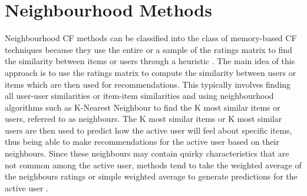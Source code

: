
\section{Neighbourhood Methods}

Neighbourhood CF methods can be classified into the class of memory-based CF techniques because they use the entire or a sample of the ratings matrix to find the similarity between items or users through a heuristic \cite{memorybased, schafer2007collaborative}. The main idea of this approach is to use the ratings matrix to compute the similarity between users or items which are then used for recommendations. This typically involves finding all user-user similarities or item-item similarities and using neighbourhood algorithms such as K-Nearest Neighbour to find the K most similar items or users, referred to as neighbours. The K most similar items or K most similar users are then used to predict how the active user will feel about specific items, thus being able to make recommendations for the active user based on their neighbours. Since these neighbours may contain quirky characteristics that are not common among the active user, methods tend to take the weighted average of the neighbours ratings or simple weighted average to generate predictions for the active user \cite{survey}. 

